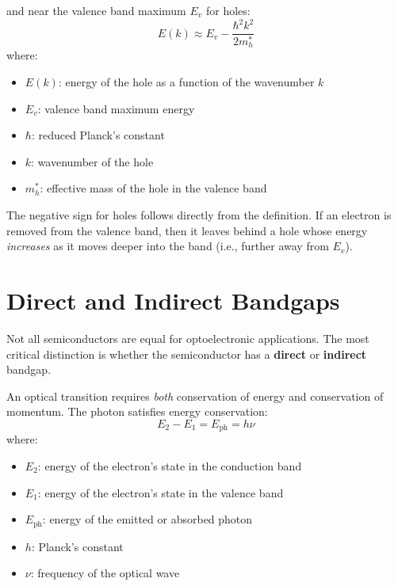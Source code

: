 and near the valence band maximum $E_v$ for holes:
\begin{equation*}
    E(k) \approx E_v - \frac{\hbar^2 k^2}{2 m^*_h}
\end{equation*}
where:
\begin{itemize}
    \item $E(k)$: energy of the hole as a function of the wavenumber $k$
    \item $E_v$: valence band maximum energy
    \item $\hbar$: reduced Planck's constant
    \item $k$: wavenumber of the hole
    \item $m^*_h$: effective mass of the hole in the valence band
\end{itemize}

The negative sign for holes follows directly from the definition. If an electron is removed from the valence band, then it leaves behind a hole whose energy \emph{increases} as it moves deeper into the band (i.e., further away from $E_v$).

\section{Direct and Indirect Bandgaps}

Not all semiconductors are equal for optoelectronic applications. The most critical distinction is whether the semiconductor has a \textbf{direct} or \textbf{indirect} bandgap.

An optical transition requires \emph{both} conservation of energy and conservation of momentum. The photon satisfies energy conservation:
\begin{equation*}
    E_2 - E_1 = E_\text{ph} = h\nu
\end{equation*}
where:
\begin{itemize}
    \item $E_2$: energy of the electron's state in the conduction band
    \item $E_1$: energy of the electron's state in the valence band
    \item $E_\text{ph}$: energy of the emitted or absorbed photon
    \item $h$: Planck's constant
    \item $\nu$: frequency of the optical wave
\end{itemize}

